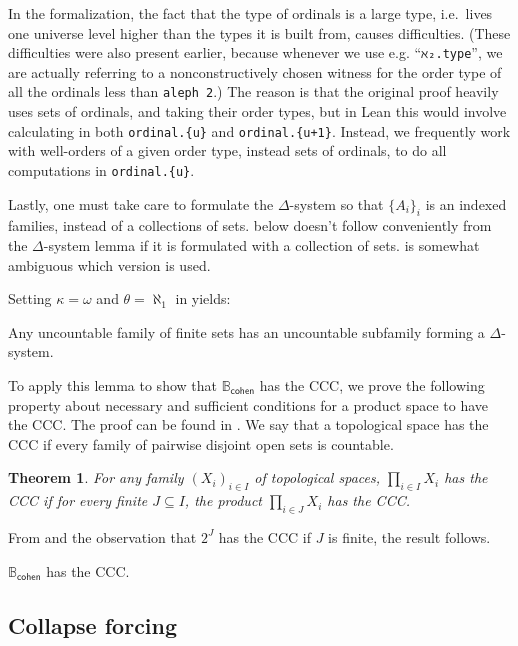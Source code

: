 \documentclass[sigplan,10pt,review, anonymous]{acmart}
\newcommand{\B}{\mathbb{B}}
\newcommand{\lil}{\lstinline}
\newtheorem{thm}{Theorem}[section]
\theoremstyle{definition}
\begin{document}
In the formalization, the fact that the type of ordinals is a large type, i.e.\ lives one universe level higher than the types it is built from, causes difficulties. (These difficulties were also present earlier, because whenever we use e.g. ``\lil{ℵ₂.type}'', we are actually referring to a nonconstructively chosen witness for the order type of all the ordinals less than \lil{aleph 2}.)
The reason is that the original proof heavily uses sets of ordinals, and taking their order types, but in Lean this would involve calculating in both \lstinline"ordinal.{u}" and \lstinline"ordinal.{u+1}".
Instead, we frequently work with well-orders of a given order type, instead sets of ordinals, to do all computations in \lstinline"ordinal.{u}".

Lastly, one must take care to formulate the $\Delta$-system so that $\{A_i\}_i$ is an indexed families, instead of a collections of sets.
 below doesn't follow conveniently from the $\Delta$-system lemma if it is formulated with a collection of sets.
\cite{kunen2014set} is somewhat ambiguous which version is used.

Setting \(\kappa = \omega\) and \(\theta = \aleph_1\) in  yields:
\begin{lemma}\label{lemma:delta-system-lemma:simple}
  Any uncountable family of finite sets has an uncountable subfamily forming a $\Delta$-system.
\end{lemma}
To apply this lemma to show that \(\B_{\mathsf{cohen}}\) has the CCC, we prove the following property about necessary and sufficient conditions for a product space to have the CCC. The proof can be found in \cite{DBLP:conf/itp/HanD19}.
We say that a topological space has the CCC if every family of pairwise disjoint open sets is countable.
\begin{thm}\label{thm:product-ccc}
  For any family $(X_i)_{i\in I}$ of topological spaces, $\prod_{i\in I} X_i$ has the CCC if for every finite $J\subseteq I$, the product $\prod_{i\in J} X_i$ has the CCC.
\end{thm}
From  and the observation that $2^J$ has the CCC if $J$ is finite, the result follows.
\begin{lemma}\label{lemma:cohen-algebra-CCC}
  \(\B_{\mathsf{cohen}}\) has the CCC.
\end{lemma}

\subsection{Collapse forcing} \label{subsect:collapse}
\end{document}
